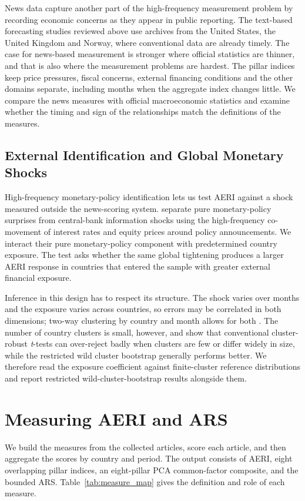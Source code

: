 \documentclass[12pt]{article}
\begin{document}
News data capture another part of the high-frequency measurement problem by recording economic concerns as they appear in public reporting. The text-based forecasting studies reviewed above use archives from the United States, the United Kingdom and Norway, where conventional data are already timely. The case for news-based measurement is stronger where official statistics are thinner, and that is also where the measurement problems are hardest. The pillar indices keep price pressures, fiscal concerns, external financing conditions and the other domains separate, including months when the aggregate index changes little. We compare the news measures with official macroeconomic statistics and examine whether the timing and sign of the relationships match the definitions of the measures.
\subsection{External Identification and Global Monetary Shocks}\label{sec:literature_external_id}
High-frequency monetary-policy identification lets us test AERI against a shock measured outside the news-scoring system. \citet{jarocinski2020} separate pure monetary-policy surprises from central-bank information shocks using the high-frequency co-movement of interest rates and equity prices around policy announcements. We interact their pure monetary-policy component with predetermined country exposure. The test asks whether the same global tightening produces a larger AERI response in countries that entered the sample with greater external financial exposure.

Inference in this design has to respect its structure. The shock varies over months and the exposure varies across countries, so errors may be correlated in both dimensions; two-way clustering by country and month allows for both \citep{cameron2011}. The number of country clusters is small, however, and \citet{mackinnon2017} show that conventional cluster-robust \textit{t}-tests can over-reject badly when clusters are few or differ widely in size, while the restricted wild cluster bootstrap generally performs better. We therefore read the exposure coefficient against finite-cluster reference distributions and report restricted wild-cluster-bootstrap results alongside them.
\section{Measuring AERI and ARS}\label{sec:methodology}
We build the measures from the collected articles, score each article, and then aggregate the scores by country and period. The output consists of AERI, eight overlapping pillar indices, an eight-pillar PCA common-factor composite, and the bounded ARS. Table~\ref{tab:measure_map} gives the definition and role of each measure.

\end{document}
